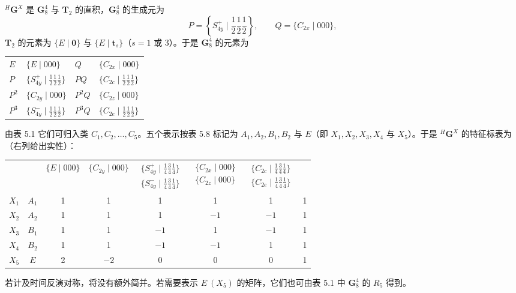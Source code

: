 ${}^{H}\mathbf{G}^{X}$ 是 $\mathbf{G}^{4}_{8}$ 与 $\mathbf{T}_{2}$ 的直积，$\mathbf{G}^{4}_{8}$ 的生成元为
\begin{equation*}
P = \left\{S^{+}_{4y} \mid {\textstyle\frac{1}{2}}{\textstyle\frac{1}{2}}{\textstyle\frac{1}{2}}\right\}, \qquad Q = \{C_{2x} \mid 000\},
\end{equation*}
$\mathbf{T}_{2}$ 的元素为 $\{E \mid \mathbf{0}\}$ 与 $\{E \mid \mathbf{t}_{s}\}$（$s = 1$ 或 3）。于是 $\mathbf{G}^{4}_{8}$ 的元素为
\begin{center}
\begin{tabular}{llll}
$E$ & $\{E \mid 000\}$ & $Q$ & $\{C_{2x} \mid 000\}$\\
$P$ & $\{S^{+}_{4y} \mid {\frac{1}{2}}{\frac{1}{2}}{\frac{1}{2}}\}$ & $PQ$ & $\{C_{2c} \mid {\frac{1}{2}}{\frac{1}{2}}{\frac{1}{2}}\}$\\
$P^{2}$ & $\{C_{2y} \mid 000\}$ & $P^{2}Q$ & $\{C_{2z} \mid 000\}$\\
$P^{3}$ & $\{S^{-}_{4y} \mid {\frac{1}{2}}{\frac{1}{2}}{\frac{1}{2}}\}$ & $P^{3}Q$ & $\{C_{2e} \mid {\frac{1}{2}}{\frac{1}{2}}{\frac{1}{2}}\}$
\end{tabular}
\end{center}
由表 5.1 它们可归入类 $C_{1}, C_{2}, \dots, C_{5}$。五个表示按表 5.8 标记为 $A_{1}, A_{2}, B_{1}, B_{2}$ 与 $E$（即 $X_{1}, X_{2}, X_{3}, X_{4}$ 与 $X_{5}$）。于是 ${}^{H}\mathbf{G}^{X}$ 的特征标表为（右列给出实性）：
\begin{center}
\begin{tabular}{lccccccc}
 & & $\{E \mid 000\}$ & $\{C_{2y} \mid 000\}$ & $\begin{array}{c}\{S^{+}_{4y} \mid {\frac{1}{4}}{\frac{3}{4}}{\frac{1}{4}}\}\\ \{S^{-}_{4y} \mid {\frac{1}{4}}{\frac{3}{4}}{\frac{1}{4}}\}\end{array}$ & $\begin{array}{c}\{C_{2x} \mid 000\}\\ \{C_{2z} \mid 000\}\end{array}$ & $\begin{array}{c}\{C_{2c} \mid {\frac{1}{4}}{\frac{3}{4}}{\frac{1}{4}}\}\\ \{C_{2e} \mid {\frac{1}{4}}{\frac{3}{4}}{\frac{1}{4}}\}\end{array}$ & \\
$X_{1}$ & $A_{1}$ & 1 & 1 & 1 & 1 & 1 & 1\\
$X_{2}$ & $A_{2}$ & 1 & 1 & 1 & $-1$ & $-1$ & 1\\
$X_{3}$ & $B_{1}$ & 1 & 1 & $-1$ & 1 & $-1$ & 1\\
$X_{4}$ & $B_{2}$ & 1 & 1 & $-1$ & $-1$ & 1 & 1\\
$X_{5}$ & $E$ & 2 & $-2$ & 0 & 0 & 0 & 1
\end{tabular}
\end{center}
若计及时间反演对称，将没有额外简并。若需要表示 $E\ (X_{5})$ 的矩阵，它们也可由表 5.1 中 $\mathbf{G}^{4}_{8}$ 的 $R_{5}$ 得到。

